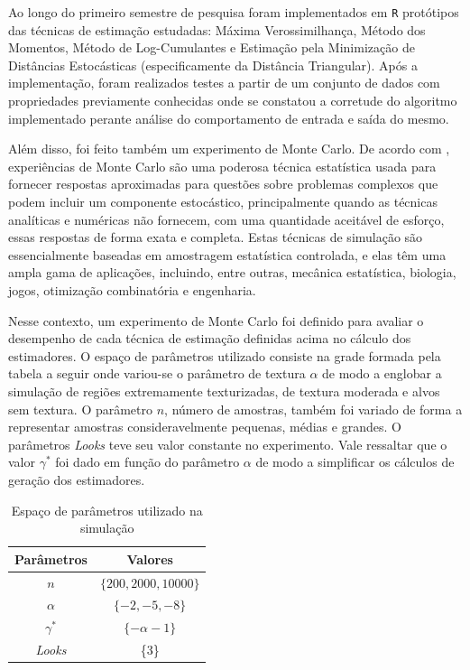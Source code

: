 \documentclass[12pt]{article}
\begin{document}
Ao longo do primeiro semestre de pesquisa foram implementados em \texttt{R} protótipos das técnicas de estimação estudadas: Máxima Verossimilhança, Método dos Momentos, Método de Log-Cumulantes e Estimação pela Minimização de Distâncias Estocásticas (especificamente da Distância Triangular). Após a implementação, foram realizados testes a partir de um conjunto de dados com propriedades previamente conhecidas onde se constatou a corretude do algoritmo implementado perante análise do comportamento de entrada e saída do mesmo.

Além disso, foi feito também um experimento de Monte Carlo.
De acordo com \citet{busto92}, experiências de Monte Carlo são uma poderosa técnica estatística usada para fornecer respostas aproximadas para questões sobre problemas complexos que podem incluir um componente estocástico, principalmente quando as técnicas analíticas e numéricas não fornecem, com uma quantidade aceitável de esforço, essas respostas de forma exata e completa. Estas técnicas de simulação são essencialmente baseadas em amostragem estatística controlada, e elas têm uma ampla gama de aplicações, incluindo, entre outras, mecânica estatística, biologia, jogos, otimização combinatória e engenharia.

Nesse contexto, um experimento de Monte Carlo foi definido para avaliar o desempenho de cada técnica de estimação definidas acima no cálculo dos estimadores. O espaço de parâmetros utilizado consiste na grade formada pela tabela a seguir onde variou-se o parâmetro de textura $\alpha$ de modo a englobar a simulação de regiões extremamente texturizadas, de textura moderada e alvos sem textura. O parâmetro $n$, número de amostras, também foi variado de forma a representar amostras consideravelmente pequenas, médias e grandes. O parâmetros \textit{Looks} teve seu valor constante no experimento. Vale ressaltar que o valor $\gamma^*$ foi dado em função do parâmetro $\alpha$ de modo a simplificar os cálculos de geração dos estimadores.

\begin{table}[H]
\centering
\caption{Espaço de parâmetros utilizado na simulação}
\smallskip
{}
\label{tab:tabela_parameters}
\begin{tabular}{c|c}
\toprule 
\multicolumn{1}{c|}{Parâmetros} & \multicolumn{1}{c}{Valores}  \\ 
\midrule
\rowcolor[gray]{.9} 
$n$ & $\{200, 2000, 10000\}$ \\ \hline
$\alpha$ & $\{-2, -5, -8\}$ \\ \hline
\rowcolor[gray]{.9} $\gamma^*$ & $\{-\alpha - 1\}$ \\ \hline
\textit{Looks} & \{3\} \\ 
\bottomrule
\end{tabular}
\end{table}
\end{document}
